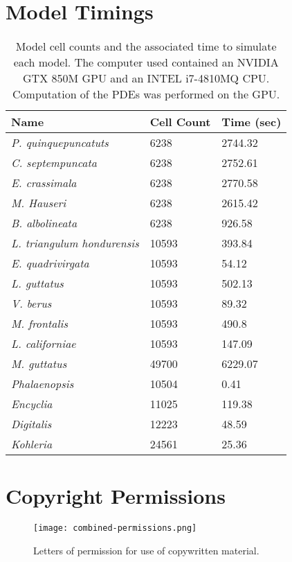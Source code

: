 \chapter{Model Timings}
\begin{table}[h]
\centering
\begin{tabular}{lll} \hline
\textbf{Name}        & \textbf{Cell Count} & \textbf{Time (sec)} \\ \hline
\textit{P. quinquepuncatuts }  & 6238                & 2744.32             \\
\textit{C. septempuncata}      & 6238                & 2752.61             \\
\textit{E. crassimala}         & 6238                & 2770.58             \\
\textit{M. Hauseri}            & 6238                & 2615.42             \\
\textit{B. albolineata}        & 6238                & 926.58              \\
\textit{L. triangulum hondurensis}          & 10593               & 393.84              \\
\textit{E. quadrivirgata}      & 10593               & 54.12               \\
\textit{L. guttatus}   & 10593               & 502.13              \\
\textit{V. berus}         & 10593               & 89.32               \\
\textit{M. frontalis}        & 10593               & 490.8               \\
\textit{L. californiae} & 10593               & 147.09              \\
\textit{M. guttatus}        & 49700               & 6229.07             \\
\textit{Phalaenopsis}  & 10504               & 0.41                \\
\textit{Encyclia}      & 11025               & 119.38              \\
\textit{Digitalis}            & 12223               & 48.59               \\
\textit{Kohleria}             & 24561               & 25.36              \\ \hline
\end{tabular}
\caption[Model cell counts and the associated time to simulate each model]{Model cell counts and the associated time to simulate each model. The computer used contained an NVIDIA GTX 850M GPU and an INTEL i7-4810MQ CPU. Computation of the PDEs was performed on the GPU.}
\label{tab:software-performance}
\end{table}

\chapter{Copyright Permissions}
\begin{figure}[H]
  \centering
  \texttt{[image: combined-permissions.png]}
  \caption[Copyright permissions]{Letters of permission for use of copywritten material.}
  \label{fig:copyrightPermissions}
\end{figure}

